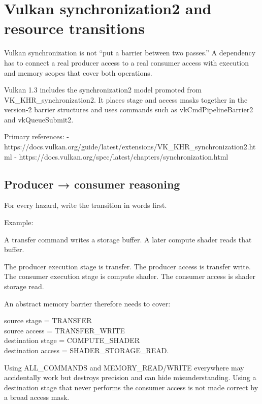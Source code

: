 \hypertarget{appendix-f15ce0d9c170}{}\label{referencestart:appendix-f15ce0d9c170}
\section{Vulkan synchronization2 and resource transitions}\label{appendix-f15ce0d9c170-vulkan-synchronization2-and-resource-transitions}

\hypertarget{appendix-f15ce0d9c170-vulkan-synchronization2-and-resource-transitions}{}

Vulkan synchronization is not ``put a barrier between two passes.'' A dependency has to connect a real producer access to a real consumer access with execution and memory scopes that cover both operations.

Vulkan 1.3 includes the synchronization2 model promoted from VK\_KHR\_synchronization2. It places stage and access masks together in the version-2 barrier structures and uses commands such as vkCmdPipelineBarrier2 and vkQueueSubmit2.

Primary references: - https://docs.vulkan.org/guide/latest/extensions/VK\_KHR\_synchronization2.html - https://docs.vulkan.org/spec/latest/chapters/synchronization.html

\subsection{Producer → consumer reasoning}\label{appendix-f15ce0d9c170-producer-consumer-reasoning}

\hypertarget{appendix-f15ce0d9c170-producer-consumer-reasoning}{}

For every hazard, write the transition in words first.

Example:

A transfer command writes a storage buffer. A later compute shader reads that buffer.

The producer execution stage is transfer. The producer access is transfer write. The consumer execution stage is compute shader. The consumer access is shader storage read.

An abstract memory barrier therefore needs to cover:

source stage = TRANSFER\\
source access = TRANSFER\_WRITE\\
destination stage = COMPUTE\_SHADER\\
destination access = SHADER\_STORAGE\_READ.

Using ALL\_COMMANDS and MEMORY\_READ/WRITE everywhere may accidentally work but destroys precision and can hide misunderstanding. Using a destination stage that never performs the consumer access is not made correct by a broad access mask.

